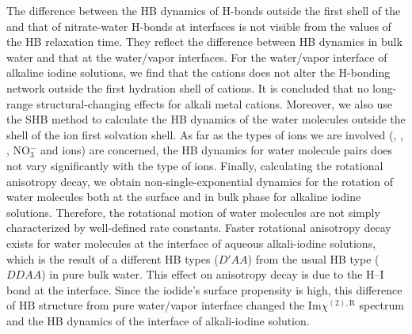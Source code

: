 The difference between the HB dynamics of H-bonds outside the first shell of the \Li and that of nitrate-water H-bonds 
at interfaces is not visible from the values of the HB relaxation time. They reflect the difference between HB dynamics in 
bulk water and that at the water/vapor interfaces. For the water/vapor interface of alkaline iodine solutions, we find 
that the cations does not alter the H-bonding network outside the first hydration shell of cations. 
It is concluded that no long-range structural-changing effects for alkali metal cations.
Moreover, we also use the SHB method to calculate the HB dynamics of the water molecules outside the shell of the ion first solvation shell.
As far as the types of ions we are involved (\Li, \Na, \K, NO$^-_3$ and \I ions) are concerned, 
the HB dynamics for water molecule pairs does not vary significantly with the type of ions.
Finally, calculating the rotational anisotropy decay, we obtain non-single-exponential dynamics 
for the rotation of water molecules both at the surface and in bulk phase for alkaline 
iodine solutions. Therefore, the rotational motion of water molecules are not simply characterized by well-defined rate constants. 
Faster rotational anisotropy decay exists for water molecules at the interface of aqueous alkali-iodine solutions, 
which is the result of a different HB types ($D'AA$) from the usual HB type ($DDAA$) in pure bulk water. 
This effect on anisotropy decay is due to the H--I bond at the interface. Since the iodide's surface propensity is high, 
this difference of HB structure from pure water/vapor interface changed the Im$\chi^{(2),\text{R}}$ spectrum and the HB dynamics 
of the interface of alkali-iodine solution. 


